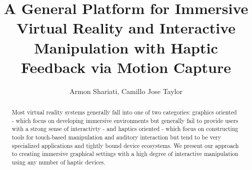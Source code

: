\documentclass{IEEEtran}
\title{A General Platform for Immersive Virtual Reality and Interactive Manipulation with Haptic Feedback via Motion Capture}
\author{Armon Shariati, Camillo Jose Taylor}
\begin{document}
\setlength{\pdfpagewidth}{8.5in}
\setlength{\pdfpageheight}{11 in}
\maketitle

\begin{abstract}
    Most virtual reality systems generally fall into one of two categories:
    graphics oriented - which focus on developing immersive environments but
    generally fail to provide users with a strong sense of interactivty - and
    haptics oriented - which focus on constructing tools for touch-based
    manipulation and auditory interaction but tend to be very specialized
    applications and tightly bound device ecosystems. We present our approach
    to creating immersive graphical settings with a high degree of interactive
    manipulation using any number of haptic devices.
\end{abstract}






\end{document}
